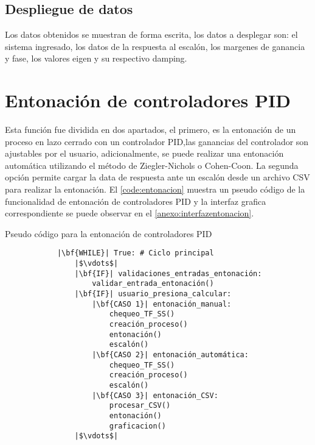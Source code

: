     \subsection{Despliegue de datos}
        
        Los datos obtenidos se muestran de forma escrita, los datos a desplegar son: el sistema ingresado, los datos de la respuesta al escalón, los margenes de ganancia y fase, los valores eigen y su respectivo damping.

\section{Entonación de controladores PID}

    Esta función fue dividida en dos apartados, el primero, es la entonación de un proceso en lazo cerrado con un controlador PID,las ganancias del controlador son ajustables por el usuario, adicionalmente, se puede realizar una entonación automática utilizando el método de Ziegler-Nichols o Cohen-Coon. La segunda opción permite cargar la data de respuesta ante un escalón desde un archivo CSV para realizar la entonación. El \cref{code:entonacion} muestra un pseudo código de la funcionalidad de entonación de controladores PID y la interfaz grafica correspondiente se puede observar en el \ref{anexo:interfazentonacion}.
    
    \begin{longlisting}
        \caption[Pseudo código - Entonación de controladores PID]{Pseudo código para la entonación de controladores PID}
        \label{code:entonacion}				
        \begin{verbatim}
            |\bf{WHILE}| True: # Ciclo principal
                |$\vdots$|
                |\bf{IF}| validaciones_entradas_entonación:
                    validar_entrada_entonación()
                |\bf{IF}| usuario_presiona_calcular:
                    |\bf{CASO 1}| entonación_manual:
                        chequeo_TF_SS()
                        creación_proceso()
                        entonación()
                        escalón()
                    |\bf{CASO 2}| entonación_automática:
                        chequeo_TF_SS()
                        creación_proceso()
                        escalón()
                    |\bf{CASO 3}| entonación_CSV:
                        procesar_CSV()
                        entonación()
                        graficacion()
                |$\vdots$|
        \end{verbatim}
    \end{longlisting}

